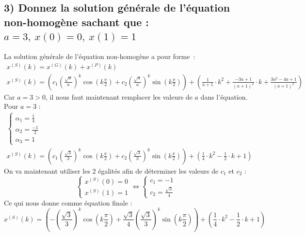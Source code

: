 \documentclass[11pt,a4paper]{report}
\begin{document}
		\subsection*{3) Donnez la solution générale de l'équation non-homogène sachant que : $a=3,\ x(0) = 0,\ x(1) = 1$}
			La solution générale de l'équation non-homogène a pour forme~:
			\begin{gather*}
				x^{(S)}(k) = x^{(G)}(k) + x^{(P)}(k)\\
				x^{(S)}(k) = \left(c_1 \left(\frac{\sqrt{a}}{a} \right)^k \cos\left(k \frac{\pi}{2}\right) + c_2\left(\frac{\sqrt{a}}{a}\right)^k \sin\left(k \frac{\pi}{2}\right)\right) + \left(\frac{1}{a+1} \cdot k^2 + \frac{-3a + 1}{(a+1)^2} \cdot k + \frac{3a^2-4a+1}{(a+1)^2}\right)
			\end{gather*}
			Car $a = 3 > 0$, il nous faut maintenant remplacer les valeurs de $a$ dans l'équation. Pour $a=3$ :
			\begin{gather*}
				\begin{cases}
					\alpha_1 = \frac{1}{4}\\
					\alpha_2 = \frac{-1}{2} \\
					\alpha_3 = 1
				\end{cases} \\
				x^{(S)}(k) = \left(c_1 \left(\frac{\sqrt{3}}{3} \right)^k \cos\left(k \frac{\pi}{2}\right) + c_2\left(\frac{\sqrt{3}}{3}\right)^k \sin\left(k \frac{\pi}{2}\right)\right) + \left(\frac{1}{4} \cdot k^2 - \frac{1}{2} \cdot k + 1 \right)
			\end{gather*}
			On va maintenant utiliser les 2 égalités afin de déterminer les valeurs de $c_1$ et $c_2$ :
			\[
				\begin{cases}
					x^{(S)}(0) = 0\\
					x^{(S)}(1) = 1
				\end{cases} \Leftrightarrow
				\begin{cases}
					c_1 = -1\\
					c_2 = \frac{\sqrt{3}}{4}
				\end{cases}
			\]
			Ce qui nous donne comme équation finale :
			\[
				x^{(S)}(k) = \left( -\left(\frac{\sqrt{3}}{3} \right)^k \cos\left(k \frac{\pi}{2}\right) + \frac{\sqrt{3}}{4} \left(\frac{\sqrt{3}}{3}\right)^k \sin\left(k \frac{\pi}{2}\right)\right) + \left(\frac{1}{4} \cdot k^2 - \frac{1}{2} \cdot k + 1 \right)
			\]
\end{document}
